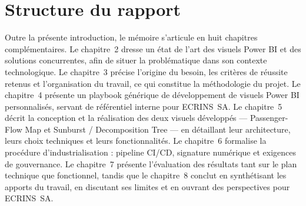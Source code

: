 \section{Structure du rapport}

Outre la présente introduction, le mémoire s’articule en huit chapitres complémentaires. Le chapitre~2 dresse un état de l’art des visuels Power BI et des solutions concurrentes, afin de situer la problématique dans son contexte technologique. Le chapitre~3 précise l’origine du besoin, les critères de réussite retenus et l’organisation du travail, ce qui constitue la méthodologie du projet. Le chapitre~4 présente un playbook générique de développement de visuels Power BI personnalisés, servant de référentiel interne pour ECRINS~SA. Le chapitre~5 décrit la conception et la réalisation des deux visuels développés — Passenger-Flow Map et Sunburst / Decomposition Tree — en détaillant leur architecture, leurs choix techniques et leurs fonctionnalités. Le chapitre~6 formalise la procédure d’industrialisation : pipeline CI/CD, signature numérique et exigences de gouvernance. Le chapitre~7 présente l’évaluation des résultats tant sur le plan technique que fonctionnel, tandis que le chapitre~8 conclut en synthétisant les apports du travail, en discutant ses limites et en ouvrant des perspectives pour ECRINS~SA.

